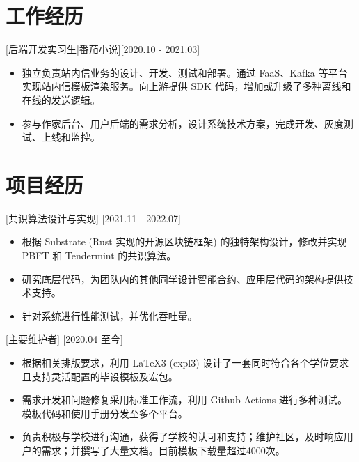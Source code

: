 \documentclass{resume}
\begin{document}
\section{工作经历}

[后端开发实习生|番茄小说][2020.10 - 2021.03] 
\begin{itemize}
  \item 独立负责站内信业务的设计、开发、测试和部署。通过 FaaS、Kafka 等平台实现站内信模板渲染服务。向上游提供 SDK 代码，增加或升级了多种离线和在线的发送逻辑。
  \item 参与作家后台、用户后端的需求分析，设计系统技术方案，完成开发、灰度测试、上线和监控。
\end{itemize}


%
%
%
%

\section{项目经历}

[共识算法设计与实现]
[2021.11 - 2022.07] 

\begin{itemize}
  \item 根据 Substrate (Rust 实现的开源区块链框架) 的独特架构设计，修改并实现 PBFT 和 Tendermint 的共识算法。
  \item 研究底层代码，为团队内的其他同学设计智能合约、应用层代码的架构提供技术支持。
  \item 针对系统进行性能测试，并优化吞吐量。 
\end{itemize}

[主要维护者]
[2020.04 至今]

\begin{itemize}
  \item 根据相关排版要求，利用 LaTeX3 (expl3) 设计了一套同时符合各个学位要求且支持灵活配置的毕设模板及宏包。
  \item 需求开发和问题修复采用标准工作流，利用 Github Actions 进行多种测试。模板代码和使用手册分发至多个平台。
  \item 负责积极与学校进行沟通，获得了学校的认可和支持；维护社区，及时响应用户的需求；并撰写了大量文档。目前模板下载量超过4000次。
\end{itemize}
\end{document}
